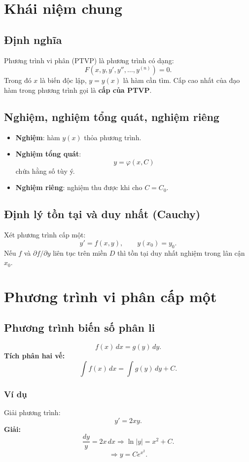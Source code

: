 \documentclass[12pt,a4paper]{article}
\begin{document}
\section{Khái niệm chung}

\subsection{Định nghĩa}
Phương trình vi phân (PTVP) là phương trình có dạng:
\[
F(x, y, y', y'', \dots, y^{(n)}) = 0.
\]
Trong đó $x$ là biến độc lập, $y = y(x)$ là hàm cần tìm.  
Cấp cao nhất của đạo hàm trong phương trình gọi là \textbf{cấp của PTVP}.

\subsection{Nghiệm, nghiệm tổng quát, nghiệm riêng}
\begin{itemize}
    \item \textbf{Nghiệm}: hàm $y(x)$ thỏa phương trình.
    \item \textbf{Nghiệm tổng quát}: 
    \[
    y = \varphi(x, C)
    \]
    chứa hằng số tùy ý.
    \item \textbf{Nghiệm riêng}: nghiệm thu được khi cho $C = C_0$.
\end{itemize}

\subsection{Định lý tồn tại và duy nhất (Cauchy)}
Xét phương trình cấp một:
\[
y' = f(x, y), \qquad y(x_0) = y_0.
\]
Nếu $f$ và $\partial f/\partial y$ liên tục trên miền $D$ thì tồn tại duy nhất nghiệm trong lân cận $x_0$.

\section{Phương trình vi phân cấp một}

\subsection{Phương trình biến số phân li}
\[
f(x)\,dx = g(y)\,dy.
\]
\textbf{Tích phân hai vế:}
\[
\int f(x)\,dx = \int g(y)\,dy + C.
\]

\subsubsection*{Ví dụ}
Giải phương trình:
\[
y' = 2xy.
\]
\textbf{Giải:}
\[
\frac{dy}{y} = 2x\,dx \Rightarrow \ln|y| = x^2 + C.
\]
\[
\Rightarrow y = Ce^{x^2}.
\]
\end{document}
